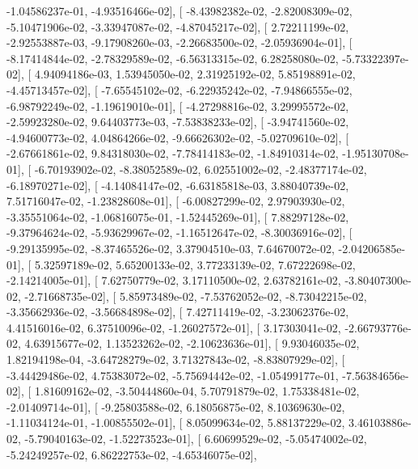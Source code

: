 \documentclass{article}
\begin{document}
         -1.04586237e-01,  -4.93516466e-02],
       [ -8.43982382e-02,  -2.82008309e-02,  -5.10471906e-02,
         -3.33947087e-02,  -4.87045217e-02],
       [  2.72211199e-02,  -2.92553887e-03,  -9.17908260e-03,
         -2.26683500e-02,  -2.05936904e-01],
       [ -8.17414844e-02,  -2.78329589e-02,  -6.56313315e-02,
          6.28258080e-02,  -5.73322397e-02],
       [  4.94094186e-03,   1.53945050e-02,   2.31925192e-02,
          5.85198891e-02,  -4.45713457e-02],
       [ -7.65545102e-02,  -6.22935242e-02,  -7.94866555e-02,
         -6.98792249e-02,  -1.19619010e-01],
       [ -4.27298816e-02,   3.29995572e-02,  -2.59923280e-02,
          9.64403773e-03,  -7.53838233e-02],
       [ -3.94741560e-02,  -4.94600773e-02,   4.04864266e-02,
         -9.66626302e-02,  -5.02709610e-02],
       [ -2.67661861e-02,   9.84318030e-02,  -7.78414183e-02,
         -1.84910314e-02,  -1.95130708e-01],
       [ -6.70193902e-02,  -8.38052589e-02,   6.02551002e-02,
         -2.48377174e-02,  -6.18970271e-02],
       [ -4.14084147e-02,  -6.63185818e-03,   3.88040739e-02,
          7.51716047e-02,  -1.23828608e-01],
       [ -6.00827299e-02,   2.97903930e-02,  -3.35551064e-02,
         -1.06816075e-01,  -1.52445269e-01],
       [  7.88297128e-02,  -9.37964624e-02,  -5.93629967e-02,
         -1.16512647e-02,  -8.30036916e-02],
       [ -9.29135995e-02,  -8.37465526e-02,   3.37904510e-03,
          7.64670072e-02,  -2.04206585e-01],
       [  5.32597189e-02,   5.65200133e-02,   3.77233139e-02,
          7.67222698e-02,  -2.14214005e-01],
       [  7.62750779e-02,   3.17110500e-02,   2.63782161e-02,
         -3.80407300e-02,  -2.71668735e-02],
       [  5.85973489e-02,  -7.53762052e-02,  -8.73042215e-02,
         -3.35662936e-02,  -3.56684898e-02],
       [  7.42711419e-02,  -3.23062376e-02,   4.41516016e-02,
          6.37510096e-02,  -1.26027572e-01],
       [  3.17303041e-02,  -2.66793776e-02,   4.63915677e-02,
          1.13523262e-02,  -2.10623636e-01],
       [  9.93046035e-02,   1.82194198e-04,  -3.64728279e-02,
          3.71327843e-02,  -8.83807929e-02],
       [ -3.44429486e-02,   4.75383072e-02,  -5.75694442e-02,
         -1.05499177e-01,  -7.56384656e-02],
       [  1.81609162e-02,  -3.50444860e-04,   5.70791879e-02,
          1.75338481e-02,  -2.01409714e-01],
       [ -9.25803588e-02,   6.18056875e-02,   8.10369630e-02,
         -1.11034124e-01,  -1.00855502e-01],
       [  8.05099634e-02,   5.88137229e-02,   3.46103886e-02,
         -5.79040163e-02,  -1.52273523e-01],
       [  6.60699529e-02,  -5.05474002e-02,  -5.24249257e-02,
          6.86222753e-02,  -4.65346075e-02],
\end{document}
